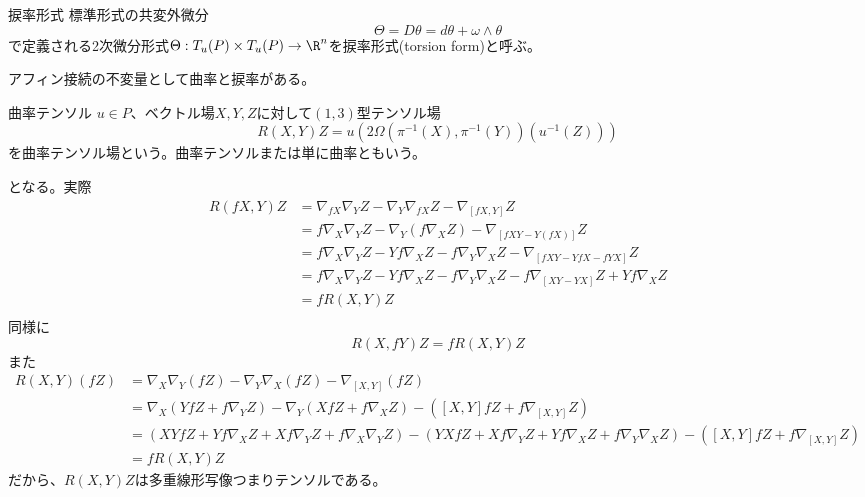 	\begin{dfn}{捩率形式}
		標準形式の共変外微分
			\[\Theta = D\theta = d\theta + \omega \wedge \theta\]
		で定義される2次微分形式$\Theta: T_u(P) \times T_u(P) \rightarrow \R^n$を捩率形式(torsion form)と呼ぶ。
	\end{dfn}

	アフィン接続の不変量として曲率と捩率がある。
	\begin{dfn}{曲率テンソル}
		$u \in P$、ベクトル場$X, Y, Z$に対して$(1, 3)$型テンソル場
			\[R(X, Y)Z = u(2\Omega(\pi^{-1}(X), \pi^{-1}(Y))(u^{-1}(Z)))\]
		を曲率テンソル場という。曲率テンソルまたは単に曲率ともいう。
	\end{dfn}
	となる。実際
	\begin{align*}
		R(fX, Y)Z
		&= \nabla_{fX}\nabla_YZ - \nabla_Y\nabla_{fX}Z - \nabla_[fX, Y]Z\\
		&= f\nabla_X\nabla_YZ - \nabla_Y(f\nabla_XZ) - \nabla_[fXY - Y(fX)]Z\\
		&= f\nabla_X\nabla_YZ - Yf\nabla_XZ - f\nabla_Y\nabla_XZ - \nabla_[fXY - YfX - fYX]Z\\
		&= f\nabla_X\nabla_YZ - Yf\nabla_XZ - f\nabla_Y\nabla_XZ - f\nabla_[XY - YX]Z + Yf\nabla_XZ\\
		&= fR(X, Y)Z\\
	\end{align*}
	同様に
		\[R(X, fY)Z = fR(X, Y)Z\]
	また
	\begin{align*}
		R(X, Y)(fZ)
		&= \nabla_X\nabla_Y(fZ) - \nabla_Y\nabla_X(fZ) - \nabla_[X, Y](fZ)\\
		&= \nabla_X(YfZ + f\nabla_YZ) - \nabla_Y(XfZ + f\nabla_XZ) - ([X, Y]fZ + f\nabla_[X, Y]Z)\\
		&= (XYfZ + Yf\nabla_XZ + Xf\nabla_YZ + f\nabla_X\nabla_YZ) - (YXfZ + Xf\nabla_YZ + Yf\nabla_XZ + f\nabla_Y\nabla_XZ) - ([X, Y]fZ + f\nabla_[X, Y]Z)\\
		&= fR(X, Y)Z
	\end{align*}
	だから、$R(X, Y)Z$は多重線形写像つまりテンソルである。

